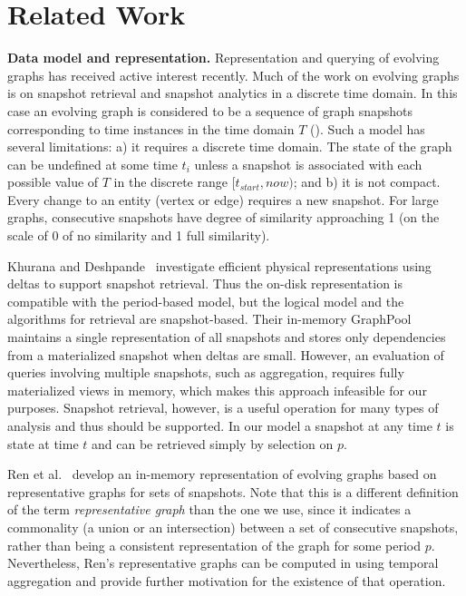 \section{Related Work}
\label{sec:related}

{\bf Data model and representation.}  Representation and querying of
evolving graphs has received active interest recently. Much of the
work on evolving graphs is on snapshot retrieval and snapshot
analytics in a discrete time domain.  In this case an evolving graph
is considered to be a sequence of graph snapshots corresponding to
time instances in the time domain $T$
(\cite{Khurana2013,DBLP:journals/tos/MiaoHLWYZPCC15,Ren2011}).  Such a
model has several limitations: a) it requires a discrete time domain.
The state of the graph can be undefined at some time $t_i$ unless a
snapshot is associated with each possible value of $T$ in the discrete
range $[t_{start}, now)$; and b) it is not compact.  Every change to
  an entity (vertex or edge) requires a new snapshot.  For large
  graphs, consecutive snapshots have degree of similarity approaching
  1 (on the scale of 0 of no similarity and 1 full similarity).

Khurana and Deshpande~\cite{Khurana2013} investigate efficient
physical representations using deltas to support snapshot retrieval.
Thus the on-disk representation is compatible with the period-based
model, but the logical model and the algorithms for retrieval are
snapshot-based.  Their in-memory GraphPool maintains a single
representation of all snapshots and stores only dependencies from a
materialized snapshot when deltas are small.  However, an evaluation
of queries involving multiple snapshots, such as aggregation, requires
fully materialized views in memory, which makes this approach
infeasible for our purposes.  Snapshot retrieval, however, is a useful
operation for many types of analysis and thus should be supported.  In
our model a snapshot at any time $t$ is state at time $t$ and can be
retrieved simply by selection on $p$.

Ren et al.~\cite{Ren2011} develop an in-memory representation of
evolving graphs based on representative graphs for sets of snapshots.
Note that this is a different definition of the term {\em
  representative graph} than the one we use, since it indicates a
commonality (a union or an intersection) between a set of consecutive
snapshots, rather than being a consistent representation of the graph
for some period $p$.  Nevertheless, Ren's representative graphs
can be computed in \ql using temporal aggregation and provide further
motivation for the existence of that operation.

